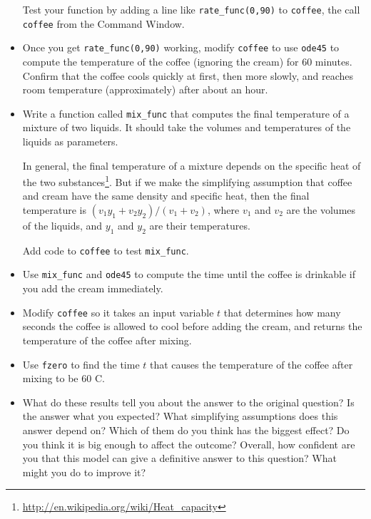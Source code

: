 \begin{ex}
\begin{itemize}
Test your function by adding a line like {\tt rate\_func(0,90)}
to {\tt coffee}, the call {\tt coffee} from the Command Window.

\item Once you get {\tt rate\_func(0,90)} working, modify
{\tt coffee} to use {\tt ode45} to compute the temperature
of the coffee (ignoring the cream) for 60 minutes. Confirm that
the coffee cools quickly at first, then more slowly, and reaches
room temperature (approximately) after about an hour.

\item Write a function called {\tt mix\_func} that computes
the final temperature of a mixture of two liquids. It should
take the volumes and temperatures of the liquids as parameters.

In general, the final temperature of a mixture depends on the specific
heat of the two
substances\footnote{\url{http://en.wikipedia.org/wiki/Heat_capacity}}.
But if we make the simplifying assumption that coffee and cream
have the same density and specific heat, then the final temperature is
$(v_1 y_1 + v_2 y_2) / (v_1 + v_2)$, where $v_1$ and $v_2$ are
the volumes of the liquids, and $y_1$ and $y_2$ are their
temperatures.

Add code to {\tt coffee} to test {\tt mix\_func}.

\item Use {\tt mix\_func} and {\tt ode45} to compute the
time until the coffee is drinkable if you add the cream
immediately.

\item Modify {\tt coffee} so it takes an input variable $t$ that
determines how many seconds the coffee is allowed to cool before
adding the cream, and returns the temperature of the coffee
after mixing.

\item Use {\tt fzero} to find the time $t$ that causes the
temperature of the coffee after mixing to be 60 \degree C.

\item What do these results tell you about the answer to the original
question? Is the answer what you expected? What simplifying
assumptions does this answer depend on? Which of them do you think
has the biggest effect? Do you think it is big enough to affect the
outcome? Overall, how confident are you that this model can give
a definitive answer to this question? What might you do to improve
it?

\end{itemize}

\end{ex}

